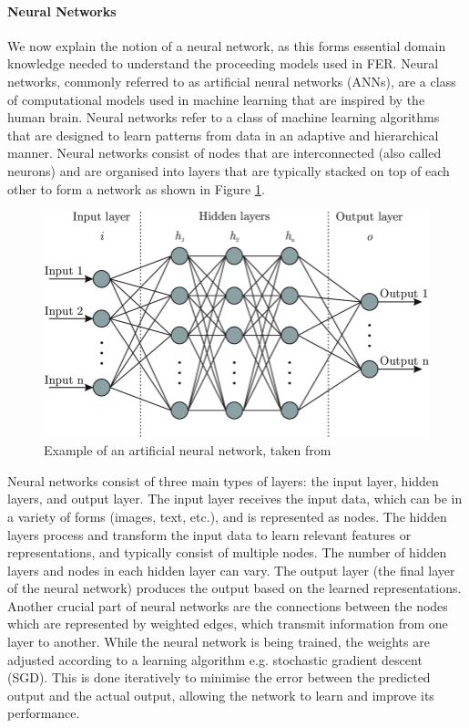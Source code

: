\documentclass[12pt, a4paper]{article}
\newcommand{\np}
    {
    \vskip 0.4cm
    }
\begin{document}
\paragraph{Neural Networks}

We now explain the notion of a neural network, as this forms essential domain knowledge needed to understand the proceeding models used in FER. Neural networks, commonly referred to as artificial neural networks (ANNs), are a class of computational models used in machine learning that are inspired by the human brain. Neural networks refer to a class of machine learning algorithms that are designed to learn patterns from data in an adaptive and hierarchical manner. Neural networks consist of nodes that are interconnected (also called neurons) and are organised into layers that are typically stacked on top of each other to form a network as shown in Figure \ref{fig:nnexample}. 
\np
\begin{figure}[H]
    \centering
    \includegraphics[scale=0.40]{images/nnexample.png}
    \caption{Example of an artificial neural network, taken from \cite{nnexample}}
    \label{fig:nnexample}
\end{figure}

Neural networks consist of three main types of layers: the input layer, hidden layers, and output layer. The input layer receives the input data, which can be in a variety of forms (images, text, etc.), and is represented as nodes. The hidden layers process and transform the input data to learn relevant features or representations, and typically consist of multiple nodes. The number of hidden layers and nodes in each hidden layer can vary. The output layer (the final layer of the neural network) produces the output based on the learned representations. Another crucial part of neural networks are the connections between the nodes which are represented by weighted edges, which transmit information from one layer to another. While the neural network is being trained, the weights are adjusted according to a learning algorithm e.g. stochastic gradient descent (SGD). This is done iteratively to minimise the error between the predicted output and the actual output, allowing the network to learn and improve its performance.
\end{document}
